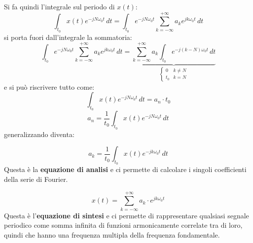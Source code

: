 \documentclass[a4paper]{article}
\begin{document}
\vspace{1em}
\noindent
Si fa quindi l'integrale sul periodo di \( x(t) \):
\[
  \int_{t_0} x(t) e^{-j N \omega_0 t} \,dt = \int_{t_0} e^{-j N \omega_0 t} \sum_{k=-\infty}^{+\infty} a_k e^{j k \omega_0 t} \, dt
\] 
si porta fuori dall'integrale la sommatoria:
\[
  \int_{t_0} e^{-j N \omega_0 t} \sum_{k=-\infty}^{+\infty} a_k e^{j k \omega_0 t} \, dt =
  \underbrace{\sum_{k=-\infty}^{+\infty} a_k \int_{t_0} e^{-j (k-N) \omega_0 t} \, dt}_{
    \begin{cases}
      0 & k \neq N\\
      t_0 & k = N
    \end{cases}
  }
\] 
e si può riscrivere tutto come:
\[
  \int_{t_0} x(t) e^{-j N \omega_0 t} \, dt = a_n \cdot t_0
\] 
\[
  a_n = \frac{1}{t_0} \int_{t_0} x(t) e^{-j N \omega_0 t} \, dt
\] 
generalizzando diventa:
\begin{definition}
  \[
    a_k = \frac{1}{t_0} \int_{t_0} x(t) e^{-j k \omega_0 t} \, dt
  \] 
  Questa è la \textbf{equazione di analisi} e ci permette di calcolare i singoli coefficienti
  della serie di Fourier.
\end{definition}
\begin{definition}
  \[
    x(t) = \sum_{k=-\infty}^{+\infty} a_k \cdot e^{j k \omega_0 t}
  \] 
  Questa è l'\textbf{equazione di sintesi} e ci
  permette di rappresentare qualsiasi segnale periodico come somma infinita di funzioni
  armonicamente correlate tra di loro, quindi che hanno una frequenza multipla della
  frequenza fondamentale.
\end{definition}
\end{document}
